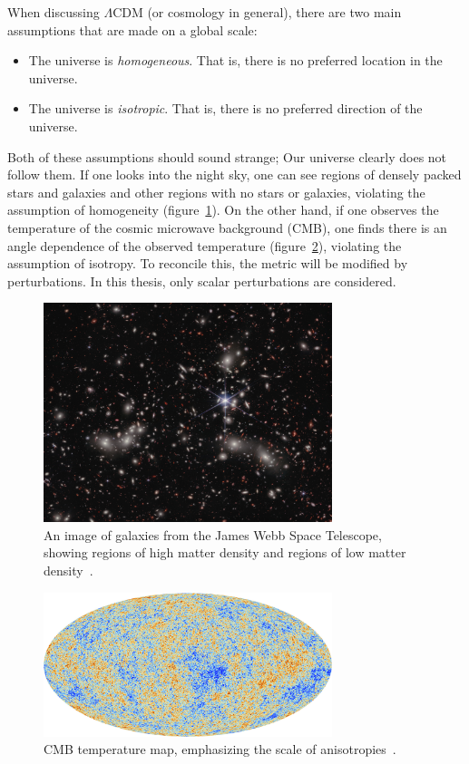 When discussing $\Lambda$CDM (or cosmology in general), there are two main assumptions that are made on a global scale:
\begin{itemize}
    \item The universe is \textit{homogeneous}. That is, there is no preferred location in the universe.
    \item The universe is \textit{isotropic}. That is, there is no preferred direction of the universe.
\end{itemize}
Both of these assumptions should sound strange; Our universe clearly does not follow them. If one looks into the night sky, one can see regions of densely packed stars and galaxies and other regions with no stars or galaxies, violating the assumption of homogeneity (figure~\ref{fig:galaxy_map}). On the other hand, if one observes the temperature of the cosmic microwave background (CMB), one finds there is an angle dependence of the observed temperature (figure~\ref{fig:cmb_tt_map}), violating the assumption of isotropy. To reconcile this, the metric will be modified by perturbations. In this thesis, only scalar perturbations are considered.
\begin{figure}[ht]
    \centering
    \includegraphics[width=0.75\textwidth]{plots/weic2305a.jpg}
    \caption{An image of galaxies from the James Webb Space Telescope, showing regions of high matter density and regions of low matter density~\cite{webb_clusters}.}
    \label{fig:galaxy_map}
\end{figure}
\begin{figure}[ht]
    \centering
    \includegraphics[width=0.75\textwidth]{plots/Planck_CMB.jpg}
    \caption{CMB temperature map, emphasizing the scale of anisotropies~\cite{planck_CMB}.}
    \label{fig:cmb_tt_map}
\end{figure}

